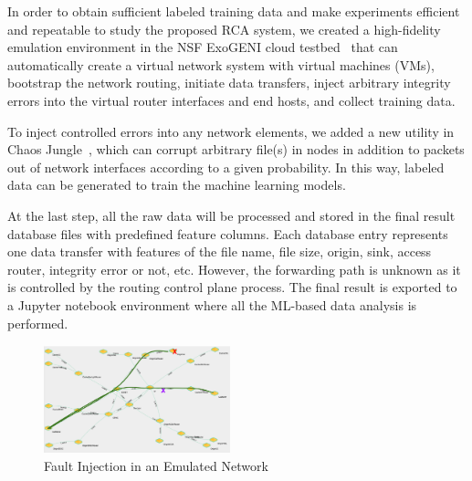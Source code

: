 In order to obtain sufficient labeled training data and make experiments efficient and repeatable to study the proposed RCA system, 
we created a high-fidelity emulation environment in the NSF ExoGENI cloud testbed~\cite{ExoGENI:web} that can automatically create a virtual network system with virtual machines (VMs), bootstrap the network routing, 
initiate data transfers, inject arbitrary integrity errors into the virtual router interfaces and end hosts, and collect training data.

To inject controlled errors into any network elements, we added a new utility in Chaos Jungle~\cite{swip:pearc:2019,chaosjungle:web}, which can corrupt arbitrary file(s) in nodes in addition to packets out of network interfaces according to a given probability. In this way, labeled data can be generated to train the machine learning models. 

At the last step, all the raw data will be processed and stored in the final result database files with predefined feature columns. Each database entry represents one data transfer with features of the file name, file size, origin, sink, access router, integrity error or not, etc. However, the forwarding path is unknown as it is controlled by the routing control plane process. The final result is exported to a Jupyter notebook environment where all the ML-based data analysis is performed.


\begin{figure}[!ht]
\begin{center}
\includegraphics[width=0.48\textwidth]{./figure/ChaosJungle}
\end{center}
\caption{Fault Injection in an Emulated Network}
\label{fig:topology}
\vspace{-0.1in}
\end{figure}


